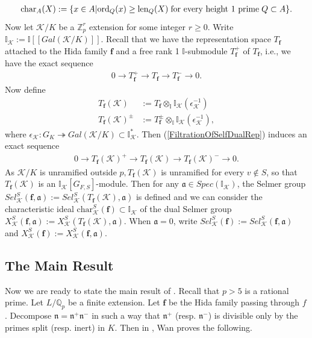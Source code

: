 \documentclass[reqno,10pt]{amsart}
\newcommand{\zp}{\mathbb{Z}_{p}}
\newcommand{\qp}{\mathbb{Q}_{p}}
\newcommand{\I}{\mathbb{I}}
\newcommand{\f}{\mathbf{f}}
\newcommand{\ma}{\mathfrak{a}}
\theoremstyle{plain}
\theoremstyle{definition}
\begin{document}
\begin{align*}
    \mathrm{char}_A(X) := \{ x \in A | \mathrm{ord}_Q(x) \geq \mathrm{len}_Q(X) \hspace{1mm} \text{for every height 1 prime} \hspace{1mm} Q \subset A \}.
\end{align*}
Now let $\mathcal{K}/K$ be a $\zp^r$ extension for some integer $r \geq 0$. Write $\I_\mathcal{K} := \I[[Gal(\mathcal{K}/K)]]$. Recall that we have the representation space $T_\f$ attached to the Hida family $\f$ and a free rank 1 $\I$-submodule $T_\f^+$ of $T_\f$, i.e., we have the exact sequence
\begin{align} \label{FiltrationOfSelfDualRep}
    0 \rightarrow T_\f^+ \rightarrow T_\f \rightarrow T_\f^- \rightarrow 0.
\end{align}
Now define
\begin{align*}
    T_\f(\mathcal{K}) & := T_\f \otimes_\I \I_\mathcal{K}(\epsilon_\mathcal{K}^{-1}) \\
    T_\f(\mathcal{K})^\pm & := T_\f^\pm \otimes_\I \I_\mathcal{K}(\epsilon_\mathcal{K}^{-1}),
\end{align*}
where $\epsilon_\mathcal{K} : G_K \twoheadrightarrow Gal(\mathcal{K}/K) \subset \I_\mathcal{K}^*$. Then (\ref{FiltrationOfSelfDualRep}) induces an exact sequence
\begin{align*}
    0 \rightarrow T_\f(\mathcal{K})^+ \rightarrow T_\f(\mathcal{K}) \rightarrow T_\f(\mathcal{K})^- \rightarrow 0.
\end{align*}
As $\mathcal{K}/K$ is unramified outside $p, T_\f(\mathcal{K})$ is unramified for every $v \not\in S$, so that $T_\f(\mathcal{K})$ is an $\I_\mathcal{K}[G_{F,S}]$-module. Then for any $\mathfrak{a} \in Spec(\I_\mathcal{K})$, the Selmer group $Sel^S_\mathcal{K}(\f,\mathfrak{a}) := Sel^S_\mathcal{K}(T_\f(\mathcal{K}),\ma)$ is defined and we can consider the characteristic ideal $\mathrm{char}^S_\mathcal{K}(\f) \subset \I_\mathcal{K}$ of the dual Selmer group $X^S_\mathcal{K}(\f,\mathfrak{a}) := X^S_\mathcal{K}(T_\f(\mathcal{K}),\mathfrak{a})$. When $\mathfrak{a} = 0$, write $Sel^S_\mathcal{K}(\f) := Sel^S_\mathcal{K}(\f,\mathfrak{a})$ and $X^S_\mathcal{K}(\f) := X^S_\mathcal{K}(\f,\mathfrak{a})$.

\subsection{The Main Result} 
Now we are ready to state the main result of \cite{Wan}. Recall that $p > 5$ is a rational prime. Let $L/\qp$ be a finite extension. Let $\f$ be the Hida family passing through $f$. Decompose $\mathfrak{n} = \mathfrak{n}^+\mathfrak{n}^-$ in such a way that $\mathfrak{n}^+$ (resp. $\mathfrak{n}^-$) is divisible only by the primes split (resp. inert) in $K$.
Then in \cite[Theorem 101]{Wan}, Wan proves the following.
\end{document}
